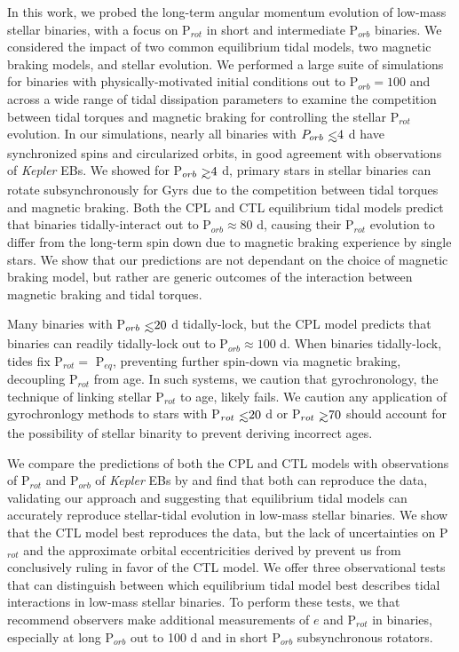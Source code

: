 \documentclass[twocolumn]{aastex61}
\def\gsim{~\rlap{$>$}{\lower 1.0ex\hbox{$\sim$}}}
\def\lsim{~\rlap{$<$}{\lower 1.0ex\hbox{$\sim$}}}
\newcommand{\kepler}[0]{\textit{Kepler}\xspace}
\begin{document}
In this work, we probed the long-term angular momentum evolution of low-mass stellar binaries, with a focus on P$_{rot}$ in short and intermediate P$_{orb}$ binaries.  We considered the impact of two common equilibrium tidal models, two magnetic braking models, and stellar evolution.  We performed a large suite of simulations for binaries with physically-motivated initial conditions out to P$_{orb} = 100$ and across a wide range of tidal dissipation parameters to examine the competition between tidal torques and magnetic braking for controlling the stellar P$_{rot}$ evolution. In our simulations, nearly all binaries with $P_{orb} \lsim 4$ d have synchronized spins and circularized orbits, in good agreement with observations of \kepler EBs. We showed for P$_{orb} \gsim 4$ d, primary stars in stellar binaries can rotate subsynchronously for Gyrs due to the competition between tidal torques and magnetic braking.  Both the CPL and CTL equilibrium tidal models predict that binaries tidally-interact out to P$_{orb} \approx 80$ d, causing their P$_{rot}$ evolution to differ from the long-term spin down due to magnetic braking experience by single stars. We show that our predictions are not dependant on the choice of magnetic braking model, but rather are generic outcomes of the interaction between magnetic braking and tidal torques.

Many binaries with P$_{orb} \lsim 20$ d tidally-lock, but the CPL model predicts that binaries can readily tidally-lock out to P$_{orb} \approx 100$ d. When binaries tidally-lock, tides fix P$_{rot} = $ P$_{eq}$, preventing further spin-down via magnetic braking, decoupling P$_{rot}$ from age.  In such systems, we caution that gyrochronology, the technique of linking stellar P$_{rot}$ to age, likely fails. We caution any application of gyrochronlogy methods to stars with P$_{rot} \lsim 20$ d or P$_{rot} \gsim 70$ should account for the possibility of stellar binarity to prevent deriving incorrect ages.  

We compare the predictions of both the CPL and CTL models with observations of P$_{rot}$ and P$_{orb}$ of \kepler EBs by \citet{Lurie2017} and find that both can reproduce the data, validating our approach and suggesting that equilibrium tidal models can accurately reproduce stellar-tidal evolution in low-mass stellar binaries.  We show that the CTL model best reproduces the data, but the lack of uncertainties on P$_{rot}$ and the approximate orbital eccentricities derived by \citet{Lurie2017} prevent us from conclusively ruling in favor of the CTL model.  We offer three observational tests that can distinguish between which equilibrium tidal model best describes tidal interactions in low-mass stellar binaries.  To perform these tests, we that recommend observers make additional measurements of $e$ and P$_{rot}$ in binaries, especially at long P$_{orb}$ out to 100 d and in short P$_{orb}$ subsynchronous rotators.
\end{document}
